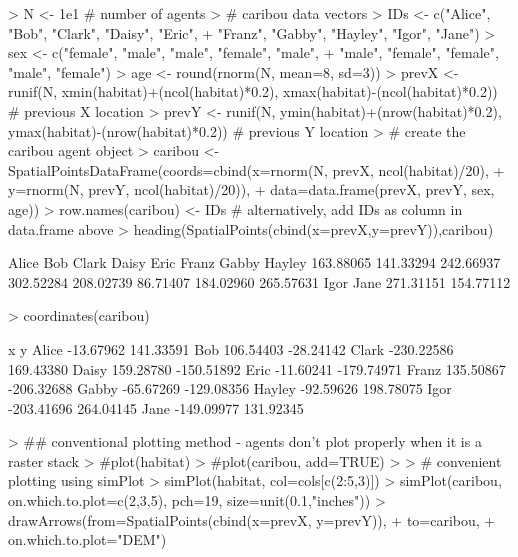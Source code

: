\documentclass{article}
\begin{document}
\begin{Schunk}
\begin{Sinput}
> N <- 1e1 # number of agents
> # caribou data vectors
> IDs <- c("Alice", "Bob", "Clark", "Daisy", "Eric",
+          "Franz", "Gabby", "Hayley", "Igor", "Jane")
> sex <- c("female", "male", "male", "female", "male",
+          "male", "female", "female", "male", "female")
> age <- round(rnorm(N, mean=8, sd=3))
> prevX <- runif(N, xmin(habitat)+(ncol(habitat)*0.2), xmax(habitat)-(ncol(habitat)*0.2)) # previous X location
> prevY <- runif(N, ymin(habitat)+(nrow(habitat)*0.2), ymax(habitat)-(nrow(habitat)*0.2)) # previous Y location
> # create the caribou agent object
> caribou <- SpatialPointsDataFrame(coords=cbind(x=rnorm(N, prevX, ncol(habitat)/20),
+                                                y=rnorm(N, prevY, ncol(habitat)/20)),
+                                   data=data.frame(prevX, prevY, sex, age))
> row.names(caribou) <- IDs # alternatively, add IDs as column in data.frame above
> heading(SpatialPoints(cbind(x=prevX,y=prevY)),caribou)
\end{Sinput}
\begin{Soutput}
    Alice       Bob     Clark     Daisy      Eric     Franz     Gabby    Hayley 
163.88065 141.33294 242.66937 302.52284 208.02739  86.71407 184.02960 265.57631 
     Igor      Jane 
271.31151 154.77112 
\end{Soutput}
\begin{Sinput}
> coordinates(caribou)
\end{Sinput}
\begin{Soutput}
                x          y
Alice   -13.67962  141.33591
Bob     106.54403  -28.24142
Clark  -230.22586  169.43380
Daisy   159.28780 -150.51892
Eric    -11.60241 -179.74971
Franz   135.50867 -206.32688
Gabby   -65.67269 -129.08356
Hayley  -92.59626  198.78075
Igor   -203.41696  264.04145
Jane   -149.09977  131.92345
\end{Soutput}
\begin{Sinput}
> ## conventional plotting method - agents don't plot properly when it is a raster stack
> #plot(habitat)
> #plot(caribou, add=TRUE)
> 
> # convenient plotting using simPlot
> simPlot(habitat, col=cols[c(2:5,3)])
> simPlot(caribou, on.which.to.plot=c(2,3,5), pch=19, size=unit(0.1,"inches"))
> drawArrows(from=SpatialPoints(cbind(x=prevX, y=prevY)),
+            to=caribou,
+            on.which.to.plot="DEM")
\end{Sinput}
\end{Schunk}
\end{document}
